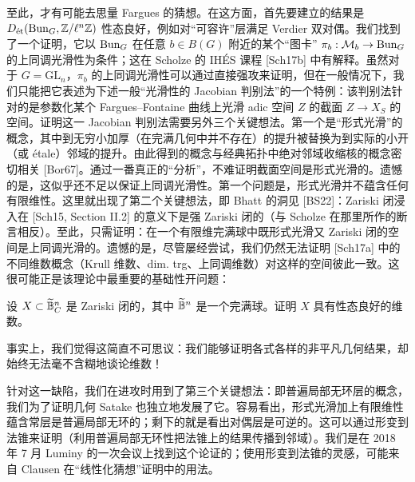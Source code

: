至此，才有可能去思量 Fargues 的猜想。在这方面，首先要建立的结果是 $D_{\text{ét}}(\mathrm{Bun}_G,\mathbb{Z}/\ell^n\mathbb{Z})$ 性态良好，例如对“可容许”层满足 Verdier 双对偶。我们找到了一个证明，它以 $\mathrm{Bun}_G$ 在任意 $b\in B(G)$ 附近的某个“图卡” $\pi_b:\mathcal{M}_b\to\mathrm{Bun}_G$ 的上同调光滑性为条件；这在 Scholze 的 IH\'ES 课程 [Sch17b] 中有解释。虽然对于 $G=\mathrm{GL}_n$，$\pi_b$ 的上同调光滑性可以通过直接强攻来证明，但在一般情况下，我们只能把它表述为下述一般“光滑性的 Jacobian 判别法”的一个特例：该判别法针对的是参数化某个 Fargues--Fontaine 曲线上光滑 adic 空间 $Z$ 的截面 $Z\to X_S$ 的空间。证明这一 Jacobian 判别法需要另外三个关键想法。第一个是“形式光滑”的概念，其中到无穷小加厚（在完满几何中并不存在）的提升被替换为到实际的小开（或 \'etale）邻域的提升。由此得到的概念与经典拓扑中绝对邻域收缩核的概念密切相关 [Bor67]。通过一番真正的“分析”，不难证明截面空间是形式光滑的。遗憾的是，这似乎还不足以保证上同调光滑性。第一个问题是，形式光滑并不蕴含任何有限维性。这里就出现了第二个关键想法，即 Bhatt 的洞见 [BS22]：Zariski 闭浸入在 [Sch15, Section II.2] 的意义下是强 Zariski 闭的（与 Scholze 在那里所作的断言相反）。至此，只需证明：在一个有限维完满球中既形式光滑又 Zariski 闭的空间是上同调光滑的。遗憾的是，尽管屡经尝试，我们仍然无法证明 [Sch17a] 中的不同维数概念（Krull 维数、dim. trg、上同调维数）对这样的空间彼此一致。这很可能正是该理论中最重要的基础性开问题：

\begin{question}
设 $X\subset\widetilde{\mathbb{B}}^n_C$ 是 Zariski 闭的，其中 $\widetilde{\mathbb{B}}^n$ 是一个完满球。证明 $X$ 具有性态良好的维数。
\end{question}

事实上，我们觉得这简直不可思议：我们能够证明各式各样的非平凡几何结果，却始终无法毫不含糊地谈论维数！

针对这一缺陷，我们在进攻时用到了第三个关键想法：即普遍局部无环层的概念，我们为了证明几何 Satake 也独立地发展了它。容易看出，形式光滑加上有限维性蕴含常层是普遍局部无环的；剩下的就是看出对偶层是可逆的。这可以通过形变到法锥来证明（利用普遍局部无环性把法锥上的结果传播到邻域）。我们是在 2018 年 7 月 Luminy 的一次会议上找到这个论证的；使用形变到法锥的灵感，可能来自 Clausen 在“线性化猜想”证明中的用法。

